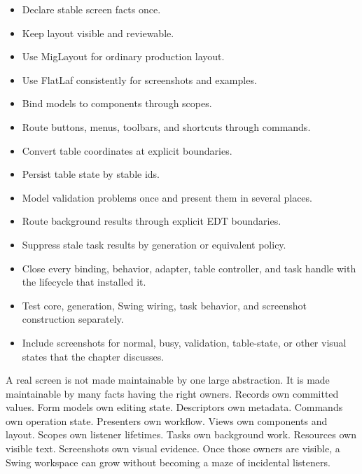 \begin{itemize}
\item Declare stable screen facts once.
\item Keep layout visible and reviewable.
\item Use MigLayout for ordinary production layout.
\item Use FlatLaf consistently for screenshots and examples.
\item Bind models to components through scopes.
\item Route buttons, menus, toolbars, and shortcuts through commands.
\item Convert table coordinates at explicit boundaries.
\item Persist table state by stable ids.
\item Model validation problems once and present them in several places.
\item Route background results through explicit EDT boundaries.
\item Suppress stale task results by generation or equivalent policy.
\item Close every binding, behavior, adapter, table controller, and task handle
with the lifecycle that installed it.
\item Test core, generation, Swing wiring, task behavior, and screenshot
construction separately.
\item Include screenshots for normal, busy, validation, table-state, or other
visual states that the chapter discusses.
\end{itemize}

A real screen is not made maintainable by one large abstraction. It is made
maintainable by many facts having the right owners. Records own committed
values. Form models own editing state. Descriptors own metadata. Commands own
operation state. Presenters own workflow. Views own components and layout.
Scopes own listener lifetimes. Tasks own background work. Resources own visible
text. Screenshots own visual evidence. Once those owners are visible, a Swing
workspace can grow without becoming a maze of incidental listeners.
